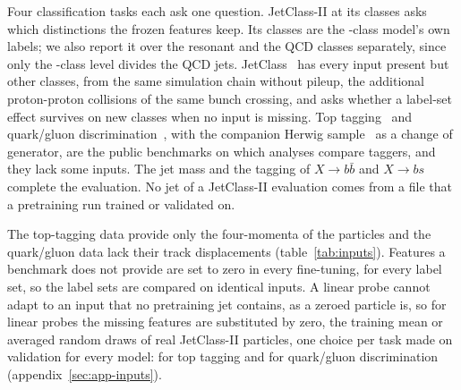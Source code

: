 Four classification tasks each ask one question. JetClass-II at its \Kfull{} classes asks which distinctions
the frozen features keep. Its classes are the \Kfull-class model's own labels; we also report it over the resonant and the QCD classes separately, since only the
\Kfull-class level divides the QCD jets. JetClass~\cite{part} has every input present but other classes, from
the same simulation chain without pileup, the additional proton-proton collisions of the same bunch crossing, and asks whether a label-set effect survives on new classes when no
input is missing. Top tagging~\cite{toptag} and quark/gluon discrimination~\cite{efn,qgpythia}, with the companion
Herwig sample~\cite{herwigsevenone,qgherwig} as a change of generator, are the public benchmarks on which analyses
compare taggers, and they lack some inputs. The jet mass and the tagging of $X\to b\bar b$ and $X\to bs$ complete
the evaluation. No jet of a JetClass-II evaluation comes from a file that a pretraining run trained or validated
on.

The top-tagging data provide only the four-momenta of the particles and the quark/gluon data lack their track
displacements (table~\ref{tab:inputs}). Features a benchmark does not provide are set to zero in every
fine-tuning, for every label set, so the label sets are compared on identical inputs. A linear probe cannot adapt
to an input that no pretraining jet contains, as a zeroed particle is, so for linear probes the missing features
are substituted by zero, the training mean or averaged random draws of real JetClass-II particles, one choice per
task made on validation for every model: \LpSubstitutionTop{} for top tagging and \LpSubstitutionQg{} for
quark/gluon discrimination (appendix~\ref{sec:app-inputs}).

